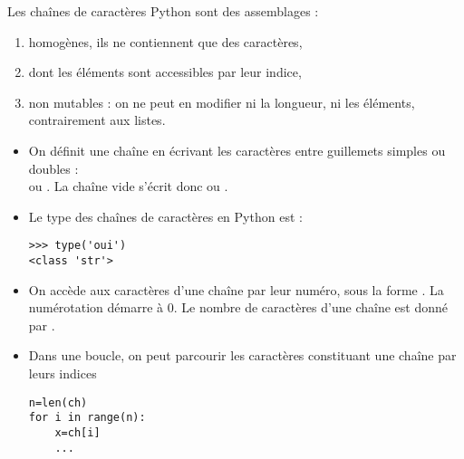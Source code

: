 Les chaînes de caractères Python sont des assemblages :
\begin{enumerate}
  \item homogènes, ils ne contiennent que des caractères,
  \item dont les éléments sont accessibles par leur indice,
  \item non mutables : on ne peut en modifier ni la longueur, ni les éléments, contrairement aux listes.
\end{enumerate}
\medskip
\begin{itemize}
  \item On définit une chaîne en écrivant les caractères entre guillemets simples ou doubles :\\
 ou . La chaîne vide s'écrit donc  ou .
\smallskip
\item Le type des chaînes de caractères en Python est  :
\begin{lstlisting}
>>> type('oui') 
<class 'str'>
\end{lstlisting}
\smallskip
\item On accède aux caractères d'une chaîne par leur numéro, sous la forme . La numérotation démarre à 0. Le nombre de caractères d'une chaîne est donné par .
\smallskip
\item Dans une boucle, on peut parcourir les caractères constituant une chaîne par leurs indices
\begin{lstlisting}
n=len(ch)
for i in range(n):
    x=ch[i]
    ...
\end{lstlisting}

\end{itemize}

